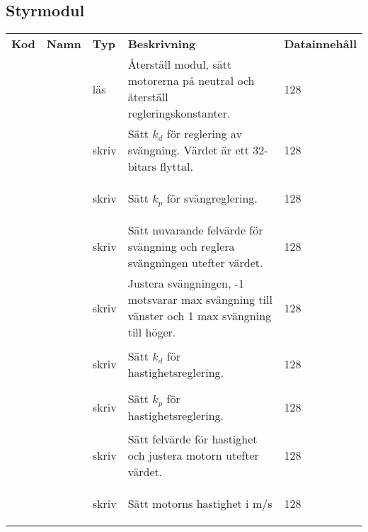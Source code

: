 \documentclass{tekniskrapport/tech.tex}
\makeatletter
\newenvironment{cmdlist}
{
    \renewcommand{\arraystretch}{1.5}
    \begin{table}[H]
        \centering
        \setlength{\tabcolsep}{8pt}
        \begin{tabular}{@{}m{1cm}m{1cm}m{1cm}m{6cm}m{8cm}}
            \bfseries Kod &
            \bfseries Namn &
            \bfseries Typ &
            \bfseries Beskrivning &
            \bfseries Datainnehåll \\
}{
        \end{tabular}
    \end{table}
}
\newcommand{\cmd}[5]{
    \mono{0x#1} & \mono{#2} & #3 & #4 &
    {\begin{bytefield}[bitwidth=0.4mm]{128}
    #5
    \end{bytefield}}\\
}
\makeatother
\begin{document}
\subsection{Styrmodul}

\begin{cmdlist}
\cmd{01}{RST}{läs}{Återställ modul, sätt motorerna på neutral och återställ
    regleringskonstanter.}{
    \emptybox{8}\emptybox{8}\emptybox{8}\emptybox{8}
    \emptybox{8}\emptybox{8}\emptybox{8}\emptybox{8}
    \emptybox{8}\emptybox{8}\emptybox{8}\emptybox{8}
    \emptybox{8}\emptybox{8}\emptybox{8}\emptybox{8}
}
\cmd{08}{RKD}{skriv}{Sätt $k_d$ för reglering av svängning. Värdet är ett
    32-bitars flyttal.}{
    \bitbox{32}{$k_d$}
    \emptybox{8}\emptybox{8}\emptybox{8}\emptybox{8}
    \emptybox{8}\emptybox{8}\emptybox{8}\emptybox{8}
    \emptybox{8}\emptybox{8}\emptybox{8}\emptybox{8}
}
\cmd{09}{RKP}{skriv}{Sätt $k_p$ för svängreglering.}{
    \bitbox{32}{$k_d$}
    \emptybox{8}\emptybox{8}\emptybox{8}\emptybox{8}
    \emptybox{8}\emptybox{8}\emptybox{8}\emptybox{8}
    \emptybox{8}\emptybox{8}\emptybox{8}\emptybox{8}
}
\cmd{0a}{RER}{skriv}{Sätt nuvarande felvärde för svängning och reglera
    svängningen utefter värdet.}{
    \bitbox{32}{$k_d$}
    \emptybox{8}\emptybox{8}\emptybox{8}\emptybox{8}
    \emptybox{8}\emptybox{8}\emptybox{8}\emptybox{8}
    \emptybox{8}\emptybox{8}\emptybox{8}\emptybox{8}
}
\cmd{0b}{RVL}{skriv}{Justera svängningen, -1 motsvarar max svängning till
    vänster och 1 max svängning till höger.}{
    \bitbox{32}{$k_d$}
    \emptybox{8}\emptybox{8}\emptybox{8}\emptybox{8}
    \emptybox{8}\emptybox{8}\emptybox{8}\emptybox{8}
    \emptybox{8}\emptybox{8}\emptybox{8}\emptybox{8}
}
\cmd{0c}{VKD}{skriv}{Sätt $k_d$ för hastighetsreglering.}{
    \bitbox{32}{$k_d$}
    \emptybox{8}\emptybox{8}\emptybox{8}\emptybox{8}
    \emptybox{8}\emptybox{8}\emptybox{8}\emptybox{8}
    \emptybox{8}\emptybox{8}\emptybox{8}\emptybox{8}
}
\cmd{0d}{VKP}{skriv}{Sätt $k_p$ för hastighetsreglering.}{
    \bitbox{32}{$k_d$}
    \emptybox{8}\emptybox{8}\emptybox{8}\emptybox{8}
    \emptybox{8}\emptybox{8}\emptybox{8}\emptybox{8}
    \emptybox{8}\emptybox{8}\emptybox{8}\emptybox{8}
}
\cmd{0e}{VER}{skriv}{Sätt felvärde för hastighet och justera motorn utefter
    värdet.}{
    \bitbox{32}{$k_d$}
    \emptybox{8}\emptybox{8}\emptybox{8}\emptybox{8}
    \emptybox{8}\emptybox{8}\emptybox{8}\emptybox{8}
    \emptybox{8}\emptybox{8}\emptybox{8}\emptybox{8}
}
    \cmd{0f}{VVL}{skriv}{Sätt motorns hastighet i m/s}{
    \bitbox{32}{$k_d$}
    \emptybox{8}\emptybox{8}\emptybox{8}\emptybox{8}
    \emptybox{8}\emptybox{8}\emptybox{8}\emptybox{8}
    \emptybox{8}\emptybox{8}\emptybox{8}\emptybox{8}
}
\end{cmdlist}
\end{document}
